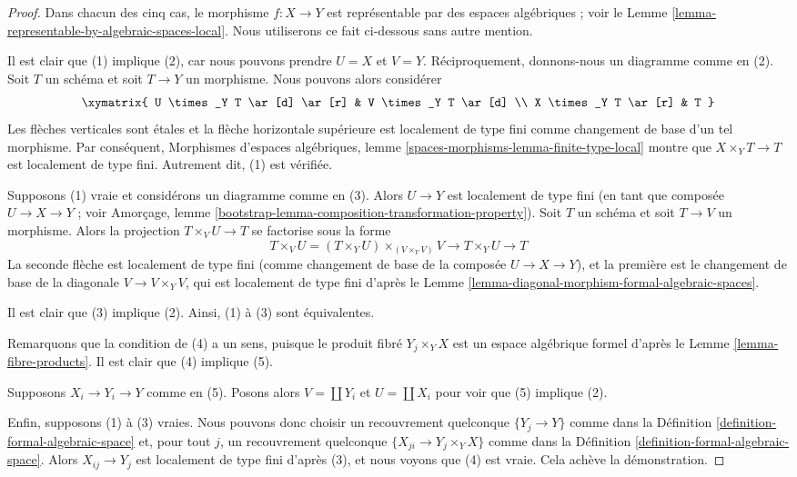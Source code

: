 \begin{proof}
Dans chacun des cinq cas, le morphisme $f : X \to Y$ est représentable
par des espaces algébriques ; voir le
Lemme \ref{lemma-representable-by-algebraic-spaces-local}.
Nous utiliserons ce fait ci-dessous sans autre mention.

\medskip\noindent
Il est clair que (1) implique (2), car nous pouvons prendre $U = X$ et $V = Y$.
Réciproquement, donnons-nous un diagramme comme en (2). Soit $T$ un schéma et
soit $T \to Y$ un morphisme. Nous pouvons alors considérer
$$
\xymatrix{
U \times_Y T \ar[d] \ar[r] & V \times_Y T \ar[d] \\
X \times_Y T \ar[r] & T
}
$$
Les flèches verticales sont étales et la flèche horizontale supérieure
est localement de type fini comme changement de base d'un tel morphisme.
Par conséquent, Morphismes d'espaces algébriques, lemme
\ref{spaces-morphisms-lemma-finite-type-local} montre que
$X \times_Y T \to T$ est localement de type fini. Autrement dit,
(1) est vérifiée.

\medskip\noindent
Supposons (1) vraie et considérons un diagramme comme en (3).
Alors $U \to Y$ est localement de type fini
(en tant que composée $U \to X \to Y$ ; voir
Amorçage, lemme \ref{bootstrap-lemma-composition-transformation-property}).
Soit $T$ un schéma et soit $T \to V$ un morphisme.
Alors la projection $T \times_V U \to T$ se factorise sous la forme
$$
T \times_V U = (T \times_Y U) \times_{(V \times_Y V)} V
\to T \times_Y U \to T
$$
La seconde flèche est localement de type fini (comme changement de base
de la composée $U \to X \to Y$), et
la première est le changement de base de la diagonale $V \to V \times_Y V$,
qui est localement de type fini d'après le
Lemme \ref{lemma-diagonal-morphism-formal-algebraic-spaces}.

\medskip\noindent
Il est clair que (3) implique (2). Ainsi, (1) à (3) sont équivalentes.

\medskip\noindent
Remarquons que la condition de (4) a un sens, puisque le produit fibré
$Y_j \times_Y X$ est un espace algébrique formel d'après le
Lemme \ref{lemma-fibre-products}.
Il est clair que (4) implique (5).

\medskip\noindent
Supposons $X_i \to Y_i \to Y$ comme en (5). Posons alors
$V = \coprod Y_i$ et $U = \coprod X_i$ pour voir que
(5) implique (2).

\medskip\noindent
Enfin, supposons (1) à (3) vraies.
Nous pouvons donc choisir un recouvrement quelconque $\{Y_j \to Y\}$ comme dans la
Définition \ref{definition-formal-algebraic-space}
et, pour tout $j$, un recouvrement quelconque $\{X_{ji} \to Y_j \times_Y X\}$ comme dans la
Définition \ref{definition-formal-algebraic-space}.
Alors $X_{ij} \to Y_j$ est localement de type fini d'après (3),
et nous voyons que (4) est vraie. Cela achève la démonstration.
\end{proof}

